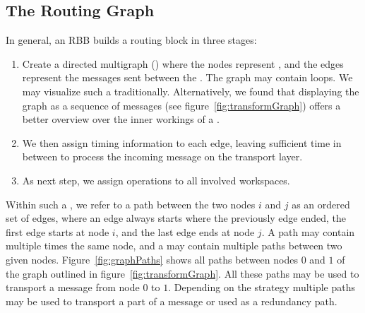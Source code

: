 \subsection{The Routing Graph}\label{sec:routingGraph}
In general, an RBB builds a routing block in three stages:
\begin{enumerate}
	\item Create a directed multigraph () where the nodes represent \VortexNodes, and the edges represent the messages sent between the \VortexNodes. The graph may contain loops. We may visualize such a  traditionally. Alternatively, we found that displaying the graph as a sequence of messages (see figure~\ref{fig:transformGraph}) offers a better overview over the inner workings of a .
	\item We then assign timing information to each edge, leaving sufficient time in between to process the incoming message on the transport layer.
	\item As next step, we assign operations to all involved workspaces.
\end{enumerate}

Within such a , we refer to a path between the two nodes $i$ and $j$ as an ordered set of edges, where an edge always starts where the previously edge ended, the first edge starts at node $i$, and the last edge ends at node $j$. A path may contain multiple times the same node, and a  may contain multiple paths between two given nodes.  Figure~\ref{fig:graphPaths} shows all paths between nodes $0$ and $1$ of the graph outlined in figure~\ref{fig:transformGraph}. All these paths may be used to transport a message from node $0$ to $1$. Depending on the strategy multiple paths may be used to transport a part of a message or used as a redundancy path.

